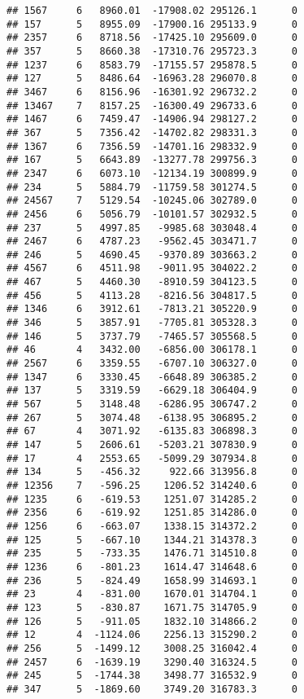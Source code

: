 \documentclass[]{article}
\begin{document}
\begin{verbatim}
## 1567     6   8960.01  -17908.02 295126.1      0
## 157      5   8955.09  -17900.16 295133.9      0
## 2357     6   8718.56  -17425.10 295609.0      0
## 357      5   8660.38  -17310.76 295723.3      0
## 1237     6   8583.79  -17155.57 295878.5      0
## 127      5   8486.64  -16963.28 296070.8      0
## 3467     6   8156.96  -16301.92 296732.2      0
## 13467    7   8157.25  -16300.49 296733.6      0
## 1467     6   7459.47  -14906.94 298127.2      0
## 367      5   7356.42  -14702.82 298331.3      0
## 1367     6   7356.59  -14701.16 298332.9      0
## 167      5   6643.89  -13277.78 299756.3      0
## 2347     6   6073.10  -12134.19 300899.9      0
## 234      5   5884.79  -11759.58 301274.5      0
## 24567    7   5129.54  -10245.06 302789.0      0
## 2456     6   5056.79  -10101.57 302932.5      0
## 237      5   4997.85   -9985.68 303048.4      0
## 2467     6   4787.23   -9562.45 303471.7      0
## 246      5   4690.45   -9370.89 303663.2      0
## 4567     6   4511.98   -9011.95 304022.2      0
## 467      5   4460.30   -8910.59 304123.5      0
## 456      5   4113.28   -8216.56 304817.5      0
## 1346     6   3912.61   -7813.21 305220.9      0
## 346      5   3857.91   -7705.81 305328.3      0
## 146      5   3737.79   -7465.57 305568.5      0
## 46       4   3432.00   -6856.00 306178.1      0
## 2567     6   3359.55   -6707.10 306327.0      0
## 1347     6   3330.45   -6648.89 306385.2      0
## 137      5   3319.59   -6629.18 306404.9      0
## 567      5   3148.48   -6286.95 306747.2      0
## 267      5   3074.48   -6138.95 306895.2      0
## 67       4   3071.92   -6135.83 306898.3      0
## 147      5   2606.61   -5203.21 307830.9      0
## 17       4   2553.65   -5099.29 307934.8      0
## 134      5   -456.32     922.66 313956.8      0
## 12356    7   -596.25    1206.52 314240.6      0
## 1235     6   -619.53    1251.07 314285.2      0
## 2356     6   -619.92    1251.85 314286.0      0
## 1256     6   -663.07    1338.15 314372.2      0
## 125      5   -667.10    1344.21 314378.3      0
## 235      5   -733.35    1476.71 314510.8      0
## 1236     6   -801.23    1614.47 314648.6      0
## 236      5   -824.49    1658.99 314693.1      0
## 23       4   -831.00    1670.01 314704.1      0
## 123      5   -830.87    1671.75 314705.9      0
## 126      5   -911.05    1832.10 314866.2      0
## 12       4  -1124.06    2256.13 315290.2      0
## 256      5  -1499.12    3008.25 316042.4      0
## 2457     6  -1639.19    3290.40 316324.5      0
## 245      5  -1744.38    3498.77 316532.9      0
## 347      5  -1869.60    3749.20 316783.3      0

\end{verbatim}
\end{document}
